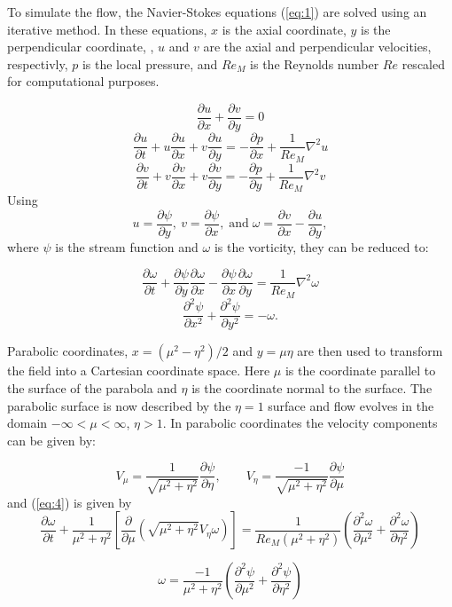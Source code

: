 \documentclass{article}
\newcommand{\pd}{\partial}
\begin{document}
To simulate the flow, the Navier-Stokes equations (\ref{eq:1}) are solved using an iterative method. In these equations, $x$ is the axial coordinate, $y$ is the perpendicular coordinate, , $u$ and $v$ are the axial and perpendicular velocities, respectivly, $p$ is the local pressure, and $Re_M$ is the Reynolds number $Re$ rescaled for computational purposes.

\[
\frac{\pd u}{\pd x} + \frac{\pd v}{\pd y} = 0
\]
\[
\frac{\pd u}{\pd t} + u \frac{\pd u}{\pd x} + v \frac{\pd u}{\pd y} = - \frac{\pd p}{\pd x} + \frac{1}{Re_M} \nabla^2 u
\]
\begin{equation}
\label{eq:1}
\frac{\pd v}{\pd t} + v \frac{\pd v}{\pd x} + v \frac{\pd v}{\pd y} = - \frac{\pd p}{\pd y} + \frac{1}{Re_M} \nabla^2 v
\end{equation}
%
Using
\begin{equation}
\label{eq:2}
u=\frac{\pd \psi}{\pd y},\: v=\frac{\pd \psi}{\pd x},\; \mathrm{and}\; \omega=\frac{\pd v}{\pd x} - \frac{\pd u}{\pd y},
\end{equation}
%
where $\psi$ is the stream function and $\omega$ is the vorticity, they can be reduced to:

\[
\frac{\pd \omega}{\pd t} + \frac{\pd \psi}{\pd y} \frac{\pd \omega}{\pd x} - \frac{\pd \psi}{\pd x} \frac{\pd \omega}{\pd y} = \frac{1}{Re_M} \nabla^2\omega
\]
\begin{equation}
\frac{\pd^2 \psi}{\pd x^2} + \frac{\pd^2 \psi}{\pd y^2} = -\omega.
\label{eq:4}
\end{equation}

Parabolic coordinates, $x=(\mu^2-\eta^2)/2$ and $y=\mu\eta$ are then used to transform the field into a Cartesian coordinate space. Here $\mu$ is the coordinate parallel to the surface of the parabola and $\eta$ is the coordinate normal to the surface. The parabolic surface is now described by the $\eta=1$ surface and flow evolves in the domain $-\infty < \mu < \infty$, $\eta> 1$. In parabolic coordinates the velocity components can be given by:

\[
V_\mu=\frac{1}{\sqrt{\mu^2+\eta^2}} \frac{\pd \psi}{\pd \eta}, \quad\quad
V_\eta=\frac{-1}{\sqrt{\mu^2+\eta^2}} \frac{\pd \psi}{\pd \mu}
\]
% 
and (\ref{eq:4}) is given by
\[
\frac{\pd \omega}{\pd t} + \frac{1}{\mu^2 + \eta^2} \left[\frac{\pd}{\pd \mu} \left(\sqrt{\mu^2 + \eta^2} V_\eta \omega \right) \right] = \frac{1}{Re_M(\mu^2 + \eta^2)} \left(\frac{\pd^2 \omega}{\pd \mu^2} + \frac{\pd^2 \omega}{\pd \eta^2} \right)
\]

\begin{equation}
\label{eq:7}
\omega = \frac{-1}{\mu^2 + \eta^2} \left(\frac{\pd^2 \psi}{\pd \mu^2} + \frac{\pd^2 \psi}{\pd \eta^2} \right)
\end{equation}
\end{document}
